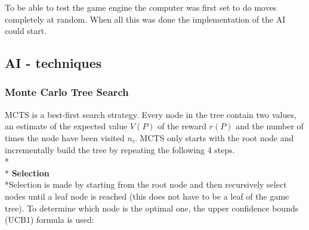 \documentclass[journal]{vgtc}                %
\begin{document}
To be able to test the game engine the computer was first set to do moves completely at random. When all this was done the implementation of the AI could start.

\subsection{AI - techniques}
\subsubsection{Monte Carlo Tree Search}
MCTS is a best-first search strategy. Every node in the tree contain two values, an estimate of the expected value $V(P)$ of the reward $r(P)$ and the number of times the node have been visited $n_{i}$. MCTS only starts with the root node and incrementally build the tree by repeating the following 4 steps.\\*\\*
\textbf{Selection}
\\*Selection is made by starting from the root node and then recursively select nodes until a leaf node is reached (this does not have to be a leaf of the game tree). To determine which node is the optimal one, the upper confidence bounds (UCB1) formula is used: 
\end{document}
